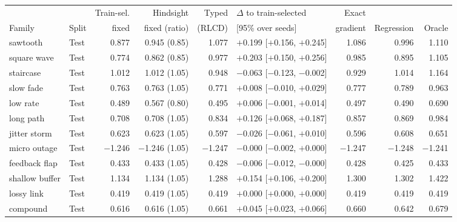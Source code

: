 \begin{tabular}{llrrrlrrr}
\toprule
 & & Train-sel. & Hindsight & Typed & $\Delta$ to train-selected & Exact & & \\
Family & Split & fixed & fixed (ratio) & (RLCD) & [95\% over seeds] & gradient & Regression & Oracle \\
\midrule
sawtooth & Test & 0.877 & 0.945 (0.85) & 1.077 & $+$0.199 [$+$0.156, $+$0.245] & 1.086 & 0.996 & 1.110 \\
square wave & Test & 0.774 & 0.862 (0.85) & 0.977 & $+$0.203 [$+$0.150, $+$0.256] & 0.985 & 0.895 & 1.105 \\
staircase & Test & 1.012 & 1.012 (1.05) & 0.948 & $-$0.063 [$-$0.123, $-$0.002] & 0.929 & 1.014 & 1.164 \\
slow fade & Test & 0.763 & 0.763 (1.05) & 0.771 & $+$0.008 [$-$0.010, $+$0.029] & 0.777 & 0.789 & 0.963 \\
low rate & Test & 0.489 & 0.567 (0.80) & 0.495 & $+$0.006 [$-$0.001, $+$0.014] & 0.497 & 0.490 & 0.690 \\
long path & Test & 0.708 & 0.708 (1.05) & 0.834 & $+$0.126 [$+$0.068, $+$0.187] & 0.857 & 0.869 & 0.984 \\
jitter storm & Test & 0.623 & 0.623 (1.05) & 0.597 & $-$0.026 [$-$0.061, $+$0.010] & 0.596 & 0.608 & 0.651 \\
micro outage & Test & $-$1.246 & $-$1.246 (1.05) & $-$1.247 & $-$0.000 [$-$0.002, $+$0.000] & $-$1.247 & $-$1.248 & $-$1.241 \\
feedback flap & Test & 0.433 & 0.433 (1.05) & 0.428 & $-$0.006 [$-$0.012, $-$0.000] & 0.428 & 0.425 & 0.433 \\
shallow buffer & Test & 1.134 & 1.134 (1.05) & 1.288 & $+$0.154 [$+$0.106, $+$0.200] & 1.300 & 1.302 & 1.422 \\
lossy link & Test & 0.419 & 0.419 (1.05) & 0.419 & $+$0.000 [$+$0.000, $+$0.000] & 0.419 & 0.419 & 0.419 \\
compound & Test & 0.616 & 0.616 (1.05) & 0.661 & $+$0.045 [$+$0.023, $+$0.066] & 0.660 & 0.642 & 0.679 \\
\bottomrule
\end{tabular}

